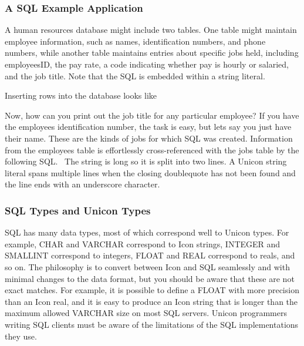 \subsubsection[A SQL Example Application]{A SQL Example Application}
A human resources database might include two tables. One
table might maintain employee information, such as names,
identification numbers, and phone numbers, while another table
maintains entries about specific jobs held, including
employee{\textquotesingle}sID, the pay rate, a code indicating whether
pay is hourly or salaried, and the job title. Note that the SQL is
embedded within a string literal.


\noindent
Inserting rows into the database looks like


Now, how can you print out the job title for any particular employee? If
you have the employee{\textquotesingle}s identification number, the
task is easy, but let{\textquotesingle}s say you just have their name.
These are the kinds of jobs for which SQL was created. Information from
the employees table is effortlessly cross-referenced with the jobs
table by the following SQL. \ The string is long so it is split into
two lines. A Unicon string literal spans multiple lines when the
closing doublequote has not been found and the line ends with an
underscore character.


\subsubsection{SQL Types and Unicon Types}

SQL has many data types, most of which correspond well to Unicon types.
For example, \textsf{CHAR} and \textsf{VARCHAR} correspond to Icon
strings, \textsf{INTEGER} and \textsf{SMALLINT} correspond to integers,
\textsf{FLOAT} and \textsf{REAL} correspond to reals, and so on. The
philosophy is to convert between Icon and SQL seamlessly and with
minimal changes to the data format, but you should be aware that these
are not exact matches. For example, it is possible to define a
\textsf{FLOAT} with more precision than an Icon real, and it is easy to
produce an Icon string that is longer than the maximum allowed
\textsf{VARCHAR} size on most SQL servers. Unicon programmers writing
SQL clients must be aware of the limitations of the SQL implementations
they use.

